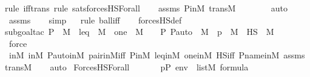 \begin{isabellebody}
{\isacharparenleft}{\kern0pt}rule\ iff{\isacharunderscore}{\kern0pt}trans{\isacharcomma}{\kern0pt}\ rule\ sats{\isacharunderscore}{\kern0pt}forcesHS{\isacharunderscore}{\kern0pt}Forall{\isacharparenright}{\kern0pt}\isanewline
\ \ \isamarkupfalse%
\ assms\ P{\isacharunderscore}{\kern0pt}in{\isacharunderscore}{\kern0pt}M\ transM\ \isanewline
\ \ \ \ \ \isamarkupfalse%
\ auto{\isacharbrackleft}{\kern0pt}{}{\isacharbrackright}{\kern0pt}\isanewline
\ \ \isamarkupfalse%
\ assms\isanewline
\ \ \isamarkupfalse%
\ simp\isanewline
\ \ \isamarkupfalse%
{\isacharparenleft}{\kern0pt}rule\ ball{\isacharunderscore}{\kern0pt}iff{\isacharparenright}{\kern0pt}\isanewline
\ \ \isamarkupfalse%
\ forcesHS{\isacharunderscore}{\kern0pt}def\ \isanewline
\ \ \isamarkupfalse%
{\isacharparenleft}{\kern0pt}subgoal{\isacharunderscore}{\kern0pt}tac\ {\isachardoublequoteopen}P\ {\isasymin}\ M\ {\isasymand}\ leq\ {\isasymin}\ M\ {\isasymand}\ one\ {\isasymin}\ M\ {\isasymand}\ {\isasymlangle}{\isasymF}{\isacharcomma}{\kern0pt}\ {\isasymG}{\isacharcomma}{\kern0pt}\ P{\isacharcomma}{\kern0pt}\ P{\isacharunderscore}{\kern0pt}auto{\isasymrangle}\ {\isasymin}\ M\ {\isasymand}\ p\ {\isasymin}\ M\ {\isasymand}\ HS\ {\isasymsubseteq}\ M{\isachardoublequoteclose}{\isacharparenright}{\kern0pt}\isanewline
\ \ \ \isamarkupfalse%
\ force\ \isanewline
\ \ \isamarkupfalse%
\ {\isasymF}{\isacharunderscore}{\kern0pt}in{\isacharunderscore}{\kern0pt}M\ {\isasymG}{\isacharunderscore}{\kern0pt}in{\isacharunderscore}{\kern0pt}M\ P{\isacharunderscore}{\kern0pt}auto{\isacharunderscore}{\kern0pt}in{\isacharunderscore}{\kern0pt}M\ pair{\isacharunderscore}{\kern0pt}in{\isacharunderscore}{\kern0pt}M{\isacharunderscore}{\kern0pt}iff\ P{\isacharunderscore}{\kern0pt}in{\isacharunderscore}{\kern0pt}M\ leq{\isacharunderscore}{\kern0pt}in{\isacharunderscore}{\kern0pt}M\ one{\isacharunderscore}{\kern0pt}in{\isacharunderscore}{\kern0pt}M\ HS{\isacharunderscore}{\kern0pt}iff\ P{\isacharunderscore}{\kern0pt}name{\isacharunderscore}{\kern0pt}in{\isacharunderscore}{\kern0pt}M\ assms\ transM\isanewline
\ \ \isamarkupfalse%
\ auto%
\endisatagproof
{\isafoldproof}%
%
\isadelimproof
\isanewline
%
\endisadelimproof
\isanewline
{}\isamarkupfalse%
\ ForcesHS{\isacharunderscore}{\kern0pt}Forall{\isacharcolon}{\kern0pt}\isanewline
\ \ \isanewline
\ \ \ \ {\isachardoublequoteopen}p{\isasymin}P{\isachardoublequoteclose}\ {\isachardoublequoteopen}env\ {\isasymin}\ list{\isacharparenleft}{\kern0pt}M{\isacharparenright}{\kern0pt}{\isachardoublequoteclose}\ {\isachardoublequoteopen}{\isasymphi}{\isasymin}formula{\isachardoublequoteclose}\isanewline

\end{isabellebody}
